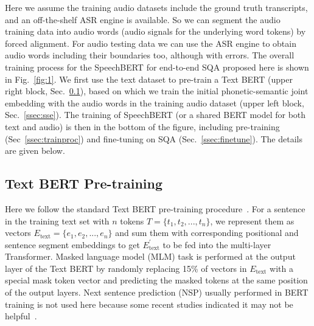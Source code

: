 \documentclass[a4paper]{article}
\begin{document}
Here we assume the training audio datasets include the ground truth transcripts, and an off-the-shelf ASR engine is available. So we can segment the audio training data into audio words (audio signals for the underlying word tokens) by forced alignment. For audio testing data we can use the ASR engine to obtain audio words including their boundaries too, although with errors. The overall training process for the SpeechBERT for end-to-end SQA proposed here is shown in Fig.~\ref{fig:1}. We first use the text dataset to pre-train a Text BERT (upper right block, Sec.~\ref{ssec:bert}), based on which we train the initial phonetic-semantic joint embedding with the audio words in the training audio dataset (upper left block, Sec.~\ref{ssec:sse}). The training of SpeechBERT (or a shared BERT model for both text and audio) is then in the bottom of the figure, including pre-training (Sec~\ref{ssec:trainproc}) and fine-tuning on SQA (Sec.~\ref{ssec:finetune}). The details are given below.


\vspace{-6pt}
\subsection{Text BERT Pre-training}
\label{ssec:bert}
\vspace{-3pt}

Here we follow the standard Text BERT pre-training procedure~\cite{devlin2019bert}. For a sentence in the training text set with $n$ tokens $T = \{t_1, t_2, ..., t_n\}$, we represent them as vectors $E_{\text{text}} = \{e_1, e_2, ..., e_n\}$ and sum them with corresponding positional and sentence segment embeddings to get $E_{\text{text}}^\prime$ to be fed into the multi-layer Transformer. Masked language model (MLM) task is performed at the output layer of the Text BERT by randomly replacing 15\% of vectors in $E_{\text{text}}$ with a special mask token vector and predicting the masked tokens at the same position of the output layers. Next sentence prediction (NSP) usually performed in BERT training is not used here because some recent studies indicated it may not be helpful~\cite{xlm2019, spanbert2019, xlnet2019, roberta2019}.

\vspace{-8pt}
\end{document}
